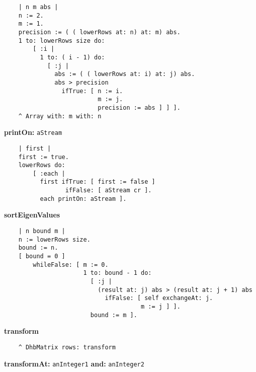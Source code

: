 \begin{verbatim}
    | n m abs |
    n := 2.
    m := 1.
    precision := ( ( lowerRows at: n) at: m) abs.
    1 to: lowerRows size do:
        [ :i |
          1 to: ( i - 1) do:
            [ :j |
              abs := ( ( lowerRows at: i) at: j) abs.
              abs > precision
                ifTrue: [ n := i.
                          m := j.
                          precision := abs ] ] ].
    ^ Array with: m with: n
\end{verbatim}
{\bf printOn:} {\tt aStream}
\begin{verbatim}
    | first |
    first := true.
    lowerRows do: 
        [ :each |
          first ifTrue: [ first := false ]
                 ifFalse: [ aStream cr ].
          each printOn: aStream ].
\end{verbatim}
{\bf sortEigenValues}
\begin{verbatim}
    | n bound m |
    n := lowerRows size.
    bound := n.
    [ bound = 0 ]
        whileFalse: [ m := 0.
                      1 to: bound - 1 do:
                        [ :j |
                          (result at: j) abs > (result at: j + 1) abs
                            ifFalse: [ self exchangeAt: j.
                                      m := j ] ].
                        bound := m ].
\end{verbatim}
{\bf transform}
\begin{verbatim}
    ^ DhbMatrix rows: transform
\end{verbatim}
{\bf transformAt:} {\tt anInteger1} {\bf and:} {\tt anInteger2}
